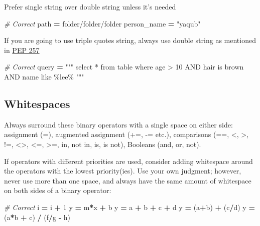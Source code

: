 \documentclass[
]{book}
\newenvironment{Shaded}{\begin{snugshade}}{\end{snugshade}}
\newcommand{\CommentTok}[1]{\textcolor[rgb]{0.56,0.35,0.01}{\textit{#1}}}
\newcommand{\DecValTok}[1]{\textcolor[rgb]{0.00,0.00,0.81}{#1}}
\newcommand{\NormalTok}[1]{#1}
\newcommand{\OperatorTok}[1]{\textcolor[rgb]{0.81,0.36,0.00}{\textbf{#1}}}
\newcommand{\SpecialCharTok}[1]{\textcolor[rgb]{0.00,0.00,0.00}{#1}}
\newcommand{\StringTok}[1]{\textcolor[rgb]{0.31,0.60,0.02}{#1}}
\begin{document}
Prefer single string over double string unless it's needed

\begin{Shaded}
\begin{Highlighting}[]
\CommentTok{\# Correct }
\NormalTok{path }\OperatorTok{=} \StringTok{\textquotesingle{}folder/folder/folder\textquotesingle{}}
\NormalTok{person\_name }\OperatorTok{=} \StringTok{"ya\textquotesingle{}qub"} 
\end{Highlighting}
\end{Shaded}

If you are going to use triple quotes string, always use double string as mentioned in \href{https://www.python.org/dev/peps/pep-0257/}{PEP 257}

\begin{Shaded}
\begin{Highlighting}[]
\CommentTok{\# Correct }
\NormalTok{query }\OperatorTok{=} \StringTok{"""}
\StringTok{        select * }
\StringTok{        from table }
\StringTok{        where }
\StringTok{            age \textgreater{} 10 }
\StringTok{            AND hair is \textquotesingle{}brown\textquotesingle{}}
\StringTok{            AND name like \textquotesingle{}}\SpecialCharTok{\%le}\StringTok{e\%\textquotesingle{}}
\StringTok{        """}
\end{Highlighting}
\end{Shaded}

\hypertarget{whitespaces}{%
\subsection{Whitespaces}\label{whitespaces}}

Always surround these binary operators with a single space on either side: assignment (=), augmented assignment (+=, -= etc.), comparisons (==, \textless, \textgreater, !=, \textless\textgreater, \textless=, \textgreater=, in, not in, is, is not), Booleans (and, or, not).

If operators with different priorities are used, consider adding whitespace around the operators with the lowest priority(ies). Use your own judgment; however, never use more than one space, and always have the same amount of whitespace on both sides of a binary operator:

\begin{Shaded}
\begin{Highlighting}[]
\CommentTok{\# Correct }
\NormalTok{i }\OperatorTok{=}\NormalTok{ i }\OperatorTok{+} \DecValTok{1} 
\NormalTok{y }\OperatorTok{=}\NormalTok{ m}\OperatorTok{*}\NormalTok{x }\OperatorTok{+}\NormalTok{ b}
\NormalTok{y }\OperatorTok{=}\NormalTok{ a }\OperatorTok{+}\NormalTok{ b }\OperatorTok{+}\NormalTok{ c }\OperatorTok{+}\NormalTok{ d}
\NormalTok{y }\OperatorTok{=}\NormalTok{ (a}\OperatorTok{+}\NormalTok{b) }\OperatorTok{+}\NormalTok{ (c}\OperatorTok{/}\NormalTok{d)}
\NormalTok{y }\OperatorTok{=}\NormalTok{ (a}\OperatorTok{*}\NormalTok{b }\OperatorTok{+}\NormalTok{ c) }\OperatorTok{/}\NormalTok{ (f}\OperatorTok{/}\NormalTok{g }\OperatorTok{{-}}\NormalTok{ h)}
\end{Highlighting}
\end{Shaded}
\end{document}
